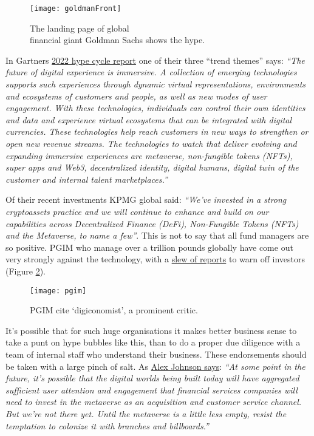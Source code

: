 \documentclass[
	10pt, %
	fleqn, %
	a5paper, %
]{LegrandOrangeBook}
\begin{document}
\begin{figure}[ht]\centering %
	\texttt{[image: goldmanFront]}
	\caption{The landing page of global\\financial giant Goldman Sachs shows the hype.}
	\label{fig:goldmanFront}
\end{figure}
In Gartners \href{https://www.itp.net/emergent-tech/gartner-says-nfts-metaverse-web3-will-expand-immersive-experiences}{2022 hype cycle report} one of their three ``trend themes'' says: \textit{``The future of digital experience is immersive. A collection of emerging technologies supports such experiences through dynamic virtual representations, environments and ecosystems of customers and people, as well as new modes of user engagement. With these technologies, individuals can control their own identities and data and experience virtual ecosystems that can be integrated with digital currencies. These technologies help reach customers in new ways to strengthen or open new revenue streams.
The technologies to watch that deliver evolving and expanding immersive experiences are metaverse, non-fungible tokens (NFTs), super apps and Web3, decentralized identity, digital humans, digital twin of the customer and internal talent marketplaces.''}\par
Of their recent investments KPMG global said: \textit{``We've invested in a strong cryptoassets practice and we will continue to enhance and build on our capabilities across Decentralized Finance (DeFi), Non-Fungible Tokens (NFTs) and the Metaverse, to name a few''}. This is not to say that all fund managers are so positive. PGIM who manage over a trillion pounds globally have come out very strongly against the technology, with a \href{https://www.pgim.com/megatrends/cryptocurrency-investing/bitcoin?}{slew of reports} to warn off investors (Figure \ref{fig:pgim}).\par
\begin{figure}[ht]\centering 	\texttt{[image: pgim]}
	\caption{PGIM cite `digiconomist', a prominent critic.}
	\label{fig:pgim}
\end{figure}
It's possible that for such huge organisations it makes better business sense to take a punt on hype bubbles like this, than to do a proper due diligence with a team of internal staff who understand their business. These endorsements should be taken with a large pinch of salt. As \href{https://newsletter.fintechtakes.com/p/metaverse-branches?s=r}{Alex Johnson says}: \textit{``At some point in the future, it’s possible that the digital worlds being built today will have aggregated sufficient user attention and engagement that financial services companies will need to invest in the metaverse as an acquisition and customer service channel. But we’re not there yet. Until the metaverse is a little less empty, resist the temptation to colonize it with branches and billboards.''}\par
\end{document}
